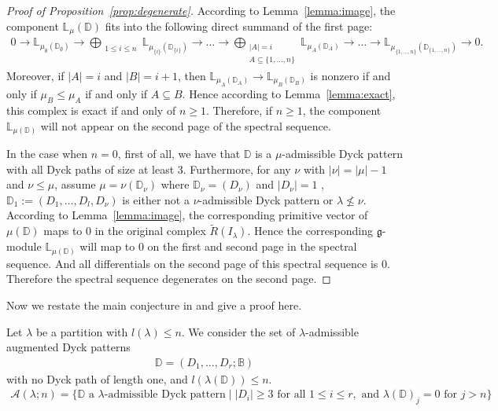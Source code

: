 \documentclass[12pt]{amsart}
\theoremstyle{definition}
\theoremstyle{remark}
\newcommand{\cA}{\mathcal{A}}
\newcommand{\bbB}{\mathbb{B}}
\newcommand{\bbD}{\mathbb{D}}
\newcommand{\bbL}{\mathbb{L}}
\newcommand{\fg}{\mathfrak{g}}
\newcommand{\dsum}{\bigoplus}
\numberwithin{equation}{section}
\begin{document}
\begin{proof}[Proof of Proposition~\ref{prop:degenerate}]
 
 
 According to Lemma~\ref{lemma:image}, the component $\bbL_{\mu}(\bbD)$ fits into the following direct summand of the first page:
 \begin{align*}
 0 \to \bbL_{\mu_{\emptyset}(\bbD_{\emptyset})} \to \dsum_{\substack{1 \leq i \leq n}} \bbL_{\mu_{\{i\}}(\bbD_{\{i\}})} \to \ldots 
 \to \dsum_{\substack{|A| = i \\ A \subseteq \{1,\ldots,n\}}} \bbL_{\mu_A(\bbD_A)} \to \ldots \to \bbL_{\mu_{\{1,\ldots,n\}}(\bbD_{\{1,\ldots,n\}})} \to 0.      
 \end{align*}
Moreover, if $|A| = i$ and $|B| = i+1$, then $\bbL_{\mu_A(\bbD_A)} \to \bbL_{\mu_B(\bbD_B)}$ is nonzero if and only if $\mu_B \leq \mu_A$ if and only if $A \subseteq B$. Hence according to Lemma~\ref{lemma:exact}, this complex is exact if and only of $n \geq 1$. Therefore, if $n \geq 1$, the component $\bbL_{\mu(\bbD)}$ will not appear on the second page of the spectral sequence.

In the case when $n = 0$, first of all, we have that $\bbD$ is a $\mu$-admissible Dyck pattern with all Dyck paths of size at least $3$. Furthermore, for any $\nu$ with $|\nu| = |\mu| - 1$ and $\nu \leq \mu$, assume $\mu = \nu(\bbD_{\nu})$ where $\bbD_{\nu} = (D_{\nu})$ and $|D_{\nu}| = 1$ , $\bbD_1 := (D_1,\ldots,D_l,D_{\nu})$ is either not a $\nu$-admissible Dyck pattern or $\lambda \nleq \nu$. According to Lemma~\ref{lemma:image}, the corresponding primitive vector of $\mu(\bbD)$ maps to $0$ in the original complex $\tilde{R}(I_{\lambda})$. Hence the corresponding $\fg$-module $\bbL_{\mu(\bbD)}$ will map to $0$ on the first and second page in the spectral sequence. And all differentials on the second page of this spectral sequence is $0$. Therefore the spectral sequence degenerates on the second page.
\end{proof}

Now we restate the main conjecture in \cite{RW} and give a proof here.

Let $\lambda$ be a partition with $l(\lambda) \leq n$. We consider the set of $\lambda$-admissible augmented Dyck patterns
\begin{align*}
    \bbD = (D_1,\ldots,D_r ; \bbB)
\end{align*}
with no Dyck path of length one, and $l(\lambda(\bbD)) \leq n$.
\begin{align*}
\cA(\lambda;n) = \{ \bbD \text{ a $\lambda$-admissible Dyck pattern} \mid |D_i| \geq 3 \text{ for all } 1 \leq i \leq r, \text{ and } \lambda(\bbD)_j = 0 \text{ for } j > n   \}
\end{align*}
\end{document}
